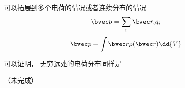 

可以拓展到多个电荷的情况或者连续分布的情况
\begin{equation}
\bvec p = \sum_i \bvec r_i q_i
\end{equation}
\begin{equation}
\bvec p = \int \bvec r \rho(\bvec r) \dd{V}
\end{equation}

可以证明， 无穷远处的电荷分布同样是

（未完成）
